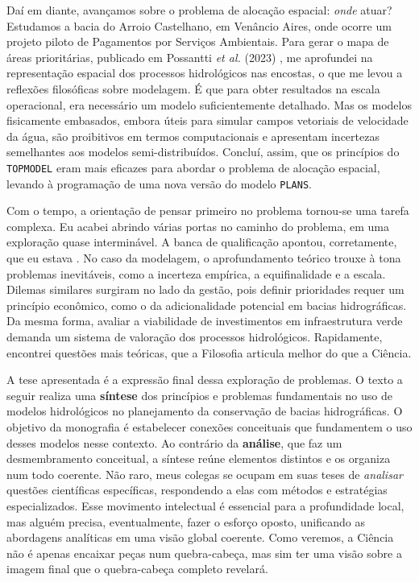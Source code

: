 \documentclass[./main.tex]{subfiles}
\begin{document}
\par Daí em diante, avançamos sobre o problema de alocação espacial: \textit{onde} atuar? Estudamos a bacia do Arroio Castelhano, em Venâncio Aires, onde ocorre um projeto piloto de Pagamentos por Serviços Ambientais. Para gerar o mapa de áreas prioritárias, publicado em Possantti \textit{et al.} (2023) \cite{Possantti2023a}, me aprofundei na representação espacial dos processos hidrológicos nas encostas, o que me levou a reflexões filosóficas sobre modelagem. É que para obter resultados na escala operacional, era necessário um modelo suficientemente detalhado. Mas os modelos fisicamente embasados, embora úteis para simular campos vetoriais de velocidade da água, são proibitivos em termos computacionais e apresentam incertezas semelhantes aos modelos semi-distribuídos. Concluí, assim, que os princípios do \texttt{TOPMODEL} eram mais eficazes para abordar o problema de alocação espacial, levando à programação de uma nova versão do modelo \texttt{PLANS}.

\par Com o tempo, a orientação de pensar primeiro no problema tornou-se uma tarefa complexa. Eu acabei abrindo várias portas no caminho do problema, em uma exploração quase interminável. A banca de qualificação apontou, corretamente, que eu estava . No caso da modelagem, o aprofundamento teórico trouxe à tona problemas inevitáveis, como a incerteza empírica, a equifinalidade e a escala. Dilemas similares surgiram no lado da gestão, pois definir prioridades requer um princípio econômico, como o da adicionalidade potencial em bacias hidrográficas. Da mesma forma, avaliar a viabilidade de investimentos em infraestrutura verde demanda um sistema de valoração dos processos hidrológicos. Rapidamente, encontrei questões mais teóricas, que a Filosofia articula melhor do que a Ciência.

\par A tese apresentada é a expressão final dessa exploração de problemas. O texto a seguir realiza uma \textbf{síntese} dos princípios e problemas fundamentais no uso de modelos hidrológicos no planejamento da conservação de bacias hidrográficas. O objetivo da monografia é estabelecer conexões conceituais que fundamentem o uso desses modelos nesse contexto. Ao contrário da \textbf{análise}, que faz um desmembramento conceitual, a síntese reúne elementos distintos e os organiza num todo coerente. Não raro, meus colegas se ocupam em suas teses de \textit{analisar} questões científicas específicas, respondendo a elas com métodos e estratégias especializados. Esse movimento intelectual é essencial para a profundidade local, mas alguém precisa, eventualmente, fazer o esforço oposto, unificando as abordagens analíticas em uma visão global coerente. Como veremos, a Ciência não é apenas encaixar peças num quebra-cabeça, mas sim ter uma visão sobre a imagem final que o quebra-cabeça completo revelará.
\end{document}
